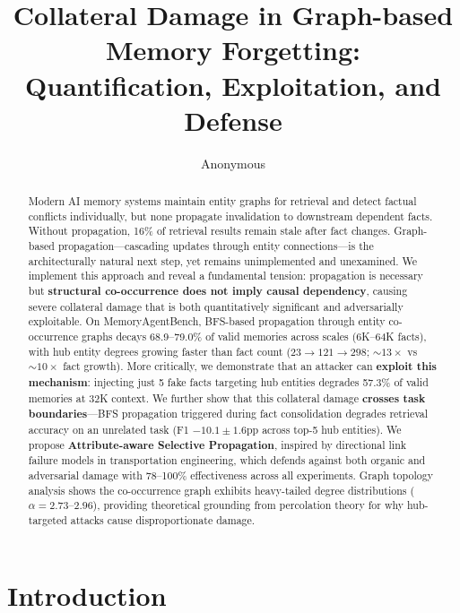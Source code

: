 \documentclass[11pt]{article}
\title{Collateral Damage in Graph-based Memory Forgetting:\\
Quantification, Exploitation, and Defense}
\author{
  Anonymous
}
\date{}
\begin{document}
\maketitle

\begin{abstract}
Modern AI memory systems maintain entity graphs for retrieval and detect factual conflicts individually, but none propagate invalidation to downstream dependent facts.
Without propagation, 16\% of retrieval results remain stale after fact changes.
Graph-based propagation---cascading updates through entity connections---is the architecturally natural next step, yet remains unimplemented and unexamined.
We implement this approach and reveal a fundamental tension: propagation is necessary but \textbf{structural co-occurrence does not imply causal dependency}, causing severe collateral damage that is both quantitatively significant and adversarially exploitable.
On MemoryAgentBench, BFS-based propagation through entity co-occurrence graphs decays 68.9--79.0\% of valid memories across scales (6K--64K facts), with hub entity degrees growing faster than fact count ($23 \rightarrow 121 \rightarrow 298$; ${\sim}13\times$ vs ${\sim}10\times$ fact growth).
More critically, we demonstrate that an attacker can \textbf{exploit this mechanism}: injecting just 5 fake facts targeting hub entities degrades 57.3\% of valid memories at 32K context.
We further show that this collateral damage \textbf{crosses task boundaries}---BFS propagation triggered during fact consolidation degrades retrieval accuracy on an unrelated task (F1 $-10.1\pm1.6$pp across top-5 hub entities).
We propose \textbf{Attribute-aware Selective Propagation}, inspired by directional link failure models in transportation engineering, which defends against both organic and adversarial damage with 78--100\% effectiveness across all experiments.
Graph topology analysis shows the co-occurrence graph exhibits heavy-tailed degree distributions ($\alpha = 2.73$--$2.96$), providing theoretical grounding from percolation theory for why hub-targeted attacks cause disproportionate damage.
\end{abstract}

\section{Introduction}
\label{sec:intro}
\end{document}
